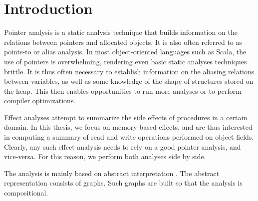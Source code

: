 \chapter{Introduction} \label{chap:intro}
Pointer analysis is a static analysis technique that builds information on the
relations between pointers and allocated objects. It is also often referred to
as points-to or alias analysis.
In most object-oriented languages such as Scala, the use of pointers is
overwhelming, rendering even basic static analyses techniques brittle. It is
thus often necessary to establish information on the aliasing relations between
variables, as well as some knowledge of the shape of structures stored on the
heap. This then enables opportunities to run more analyses or to perform
compiler optimizations.

Effect analyses attempt to summarize the side effects of procedures in a certain
domain. In this thesis, we focus on memory-based effects, and are thus interested
in computing a summary of read and write operations performed on object fields.
Clearly, any such effect analysis needs to rely on a good pointer analysis,
and vice-versa. For this reason, we perform both analyses side by side.

The analysis is mainly based on abstract interpretation
\cite{DBLP:conf/popl/CousotC77,DBLP:conf/popl/CousotC02}. The abstract
representation consists of graphs. Such graphs are built so that the analysis
is compositional.


